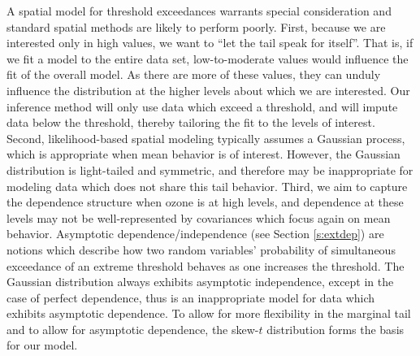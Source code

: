 \documentclass[useAMS,usenatbib,referee]{biom}
\begin{document}
A spatial model for threshold exceedances warrants special consideration and standard spatial methods are likely to perform poorly.
First, because we are interested only in high values, we want to ``let the tail speak for itself''.
That is, if we fit a model to the entire data set, low-to-moderate values would influence the fit of the overall model.
As there are more of these values, they can unduly influence the distribution at the higher levels about which we are interested.
Our inference method will only use data which exceed a threshold, and will impute data below the threshold, thereby tailoring the fit to the levels of interest.
Second, likelihood-based spatial modeling typically assumes a Gaussian process, which is appropriate when mean behavior is of interest.
However, the Gaussian distribution is light-tailed and symmetric, and therefore may be inappropriate for modeling data which does not share this tail behavior.
Third, we aim to capture the dependence structure when ozone is at high levels, and dependence at these levels may not be well-represented by covariances which focus again on mean behavior.
Asymptotic dependence/independence (see Section \ref{s:extdep}) are notions which describe how two random variables' probability of simultaneous exceedance of an extreme threshold behaves as one increases the threshold.
The Gaussian distribution always exhibits asymptotic independence, except in the case of perfect dependence, thus is an inappropriate model for data which exhibits asymptotic dependence.
To allow for more flexibility in the marginal tail and to allow for asymptotic dependence, the skew-$t$ distribution forms the basis for our model.
\end{document}

